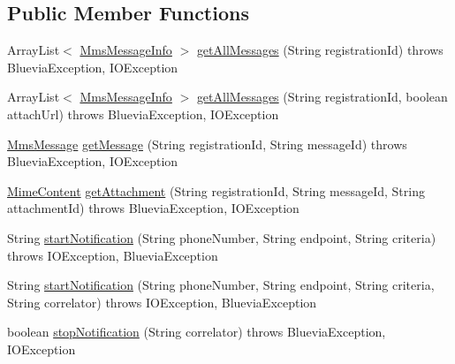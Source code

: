 \subsection*{Public Member Functions}
\begin{DoxyCompactItemize}
\item 
ArrayList$<$ \hyperlink{classcom_1_1bluevia_1_1messagery_1_1mo_1_1mms_1_1data_1_1MmsMessageInfo}{MmsMessageInfo} $>$ \hyperlink{classcom_1_1bluevia_1_1messagery_1_1mo_1_1mms_1_1client_1_1BVMoMmsClient_af6402ed5c4664aa9de87622361a92395}{getAllMessages} (String registrationId)  throws BlueviaException, IOException
\item 
ArrayList$<$ \hyperlink{classcom_1_1bluevia_1_1messagery_1_1mo_1_1mms_1_1data_1_1MmsMessageInfo}{MmsMessageInfo} $>$ \hyperlink{classcom_1_1bluevia_1_1messagery_1_1mo_1_1mms_1_1client_1_1BVMoMmsClient_afc5433dbb07fd3e5a73879bc3b3e5815}{getAllMessages} (String registrationId, boolean attachUrl)  throws BlueviaException, IOException
\item 
\hyperlink{classcom_1_1bluevia_1_1messagery_1_1mo_1_1mms_1_1data_1_1MmsMessage}{MmsMessage} \hyperlink{classcom_1_1bluevia_1_1messagery_1_1mo_1_1mms_1_1client_1_1BVMoMmsClient_a4f0e855fc51ba756891e18627cd555ec}{getMessage} (String registrationId, String messageId)  throws BlueviaException, IOException
\item 
\hyperlink{classcom_1_1bluevia_1_1messagery_1_1mo_1_1mms_1_1data_1_1MimeContent}{MimeContent} \hyperlink{classcom_1_1bluevia_1_1messagery_1_1mo_1_1mms_1_1client_1_1BVMoMmsClient_af0c03c6f616acd671f95a584fcb787d9}{getAttachment} (String registrationId, String messageId, String attachmentId)  throws BlueviaException, IOException 
\item 
String \hyperlink{classcom_1_1bluevia_1_1messagery_1_1mo_1_1mms_1_1client_1_1BVMoMmsClient_a85016ae61d419ae9c23bf1356d1909be}{startNotification} (String phoneNumber, String endpoint, String criteria)  throws IOException, BlueviaException
\item 
String \hyperlink{classcom_1_1bluevia_1_1messagery_1_1mo_1_1mms_1_1client_1_1BVMoMmsClient_a5ab2006379e28659650fa33f7e194d2b}{startNotification} (String phoneNumber, String endpoint, String criteria, String correlator)  throws IOException, BlueviaException
\item 
boolean \hyperlink{classcom_1_1bluevia_1_1messagery_1_1mo_1_1mms_1_1client_1_1BVMoMmsClient_a798b0295afeafad3e6a612a021ad2dc1}{stopNotification} (String correlator)  throws BlueviaException, IOException 
\end{DoxyCompactItemize}
